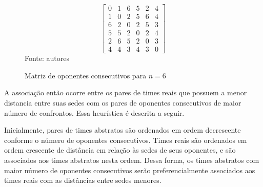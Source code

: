 \documentclass[12pt,a4paper]{article}
\begin{document}
\begin{figure}[H]
	\centering
	\caption{Matriz de oponentes consecutivos para $n=6$}
	\label{matriz:consecutivos}
	\vspace{-0.7cm}
	\[ \begin{bmatrix}
	0 & 1 & 6 & 5 & 2 & 4 \\
	1 & 0 & 2 & 5 & 6 & 4 \\
	6 & 2 & 0 & 2 & 5 & 3 \\
	5 & 5 & 2 & 0 & 2 & 4 \\
	2 & 6 & 5 & 2 & 0 & 3 \\
	4 & 4 & 3 & 4 & 3 & 0
	\end{bmatrix} \]
	\footnotesize Fonte: autores
\end{figure}

A associação então ocorre entre os pares de times reais que possuem a menor distancia entre suas sedes com os pares de oponentes consecutivos de maior número de confrontos. Essa heurística é descrita a seguir.

Inicialmente, pares de times abstratos são ordenados em ordem decrescente conforme o número de oponentes consecutivos. Times reais são ordenados em ordem crescente de distância em relação às sedes de seus oponentes, e são associados aos times abstratos nesta ordem. Dessa forma, os times abstratos com maior número de oponentes consecutivos serão preferencialmente associados aos times reais com as distâncias entre sedes menores.
\end{document}
